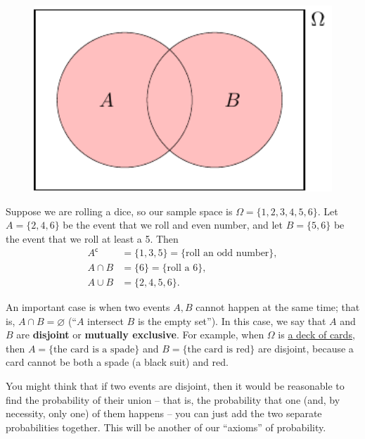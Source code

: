 \documentclass[
  letterpaper,
  DIV=11,
  numbers=noendperiod]{scrreprt}
\theoremstyle{remark}
\begin{document}
\begin{figure}

{\centering \includegraphics[width=7.63889in,height=\textheight]{sections/L03-events_files/figure-pdf/venn-or-1.pdf}

}

\end{figure}

Suppose we are rolling a dice, so our sample space is
\(\Omega = \{1,2,3,4,5,6\}\). Let \(A = \{2,4,6\}\) be the event that we
roll and even number, and let \(B = \{5,6\}\) be the event that we roll
at least a 5. Then \begin{align*}
A^\mathsf{c}&= \{1,3,5\} = \{\text{roll an odd number}\} ,\\
A \cap B &= \{6\} = \{\text{roll a 6}\} ,\\
A \cup B &= \{2,4,5,6\} .
\end{align*}

An important case is when two events \(A, B\) cannot happen at the same
time; that is, \(A \cap B = \varnothing\) (``\(A\) intersect \(B\) is
the empty set''). In this case, we say that \(A\) and \(B\) are
\textbf{disjoint} or \textbf{mutually exclusive}. For example, when
\(\Omega\) is
\href{https://en.wikipedia.org/wiki/Standard_52-card_deck}{a deck of
cards}, then \(A = \{\text{the card is a spade}\}\) and
\(B = \{\text{the card is red}\}\) are disjoint, because a card cannot
be both a spade (a black suit) and red.

You might think that if two events are disjoint, then it would be
reasonable to find the probability of their union -- that is, the
probability that one (and, by necessity, only one) of them happens --
you can just add the two separate probabilities together. This will be
another of our ``axioms'' of probability.
\end{document}
